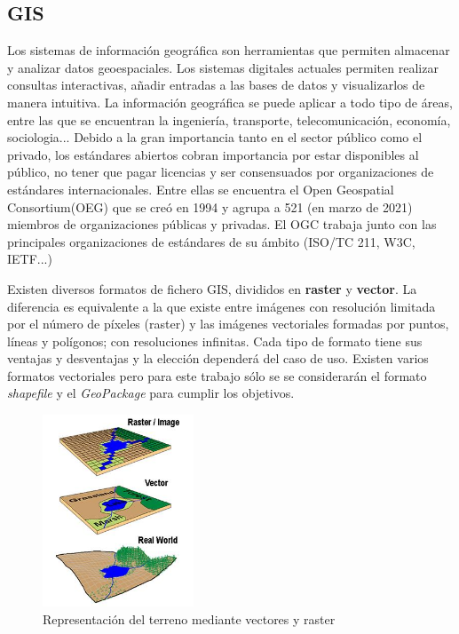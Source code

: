 \subsection{GIS} Los sistemas de información geográfica son herramientas que permiten almacenar y analizar datos
geoespaciales. Los sistemas digitales actuales permiten realizar consultas interactivas, añadir entradas a las
bases de datos y visualizarlos de manera intuitiva. La información geográfica se puede aplicar a todo tipo de
áreas, entre las que se encuentran la ingeniería, transporte, telecomunicación, economía, sociologia... Debido a
la gran importancia tanto en el sector público como el privado\cite{gis-standards}, los estándares abiertos
cobran importancia por estar disponibles al público, no tener que pagar licencias y ser consensuados por
organizaciones de estándares internacionales. Entre ellas se encuentra el Open Geospatial Consortium(OEG) que se creó
en 1994 y agrupa a 521 (en marzo de 2021) miembros de organizaciones públicas y privadas.\cite{ogc-members}
El OGC trabaja junto con las principales organizaciones de estándares de su ámbito (ISO/TC 211, W3C,
IETF...) \cite{ogc-whitepaper}

Existen diversos formatos de fichero GIS, divididos en \textbf{raster} y \textbf{vector}. La diferencia es
equivalente a la que existe entre imágenes con resolución limitada por el número de píxeles (raster) y las 
imágenes vectoriales formadas por puntos, líneas y polígonos; con resoluciones infinitas. Cada tipo de formato
tiene sus ventajas y desventajas y la elección dependerá del caso de uso. Existen varios formatos vectoriales
pero para este trabajo sólo se se considerarán el formato \textit{shapefile} y el \textit{GeoPackage} para cumplir
los objetivos.

\begin{figure}[h]
    \includegraphics[width=0.4\textwidth]{images/vector-raster.jpg}
    \centering
    \caption{Representación del terreno mediante vectores y raster}
    \label{fig:vector-raster}
\end{figure}

